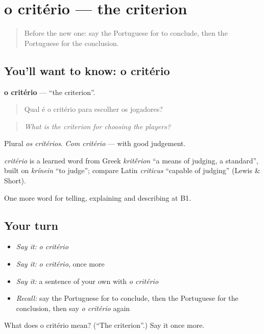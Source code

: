 \section[o critério]{o critério — the criterion}

\label{lesson:PT-C346-criterio}



\begin{quote}
Before the new one: say the Portuguese for to conclude, then the Portuguese for the conclusion.
\end{quote}

\subsection*{You'll want to know: o critério}
\textbf{o critério} — \textquotedblleft{}the criterion\textquotedblright{}.

\begin{quote}
Qual é o critério para escolher os jogadores?
\end{quote}

\begin{quote}
\emph{What is the criterion for choosing the players?}
\end{quote}

Plural \emph{os critérios}. \emph{Com critério} — with good judgement.

\begin{cousinweb}
\emph{critério} is a learned word from Greek \emph{krit\'{\={e}}rion} \textquotedblleft{}a means of judging, a standard\textquotedblright{}, built on \emph{krínein} \textquotedblleft{}to judge\textquotedblright{}; compare Latin \emph{criticus} \textquotedblleft{}capable of judging\textquotedblright{} (Lewis \& Short).
\end{cousinweb}

\begin{grammarlens}[title={What you've built}]
One more word for telling, explaining and describing at B1.
\end{grammarlens}

\subsection*{Your turn}
\begin{itemize}
\raggedright
  \item \emph{Say it:} \emph{o critério}
  \item \emph{Say it:} \emph{o critério}, once more
  \item \emph{Say it:} a sentence of your own with \emph{o critério}
  \item \emph{Recall:} say the Portuguese for to conclude, then the Portuguese for the conclusion, then say \emph{o critério} again
\end{itemize}

\begin{tcolorbox}[breakable,colback=teal!4,colframe=teal!35!black,title={Before you move on}]
What does o critério mean? (\textquotedblleft{}The criterion\textquotedblright{}.) Say it once more.
\end{tcolorbox}
